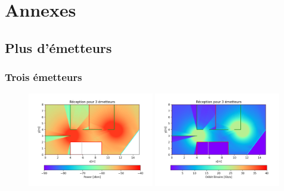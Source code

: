 \documentclass[sn-mathphys-num]{sn-jnl}%
\theoremstyle{thmstyleone}%
\theoremstyle{thmstyletwo}%
\theoremstyle{thmstylethree}%
\begin{document}
\section{Annexes}


\subsection{Plus d’émetteurs}
\subsubsection{Trois émetteurs}
\label{sub-3}

\begin{figure}[H]
    \centering
    \includegraphics[width=0.49\textwidth]{images/opti/3.png}
    \includegraphics[width=0.49\textwidth]{images/opti/3_bin.png}
\end{figure}
\end{document}
